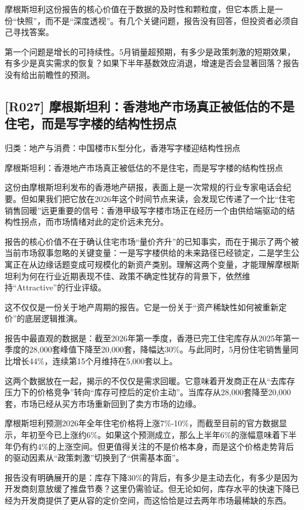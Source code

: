 \documentclass[11pt]{ctexart}
\begin{document}
摩根斯坦利这份报告的核心价值在于数据的及时性和颗粒度，但它本质上是一份“快照”，而不是“深度透视”。有几个关键问题，报告没有回答，但投资者必须自己寻找答案。

第一个问题是增长的可持续性。5月销量超预期，有多少是政策刺激的短期效果，有多少是真实需求的恢复？如果下半年基数效应消退，增速是否会显著回落？报告没有给出前瞻性的预测。

\subsection{[R027] 摩根斯坦利：香港地产市场真正被低估的不是住宅，而是写字楼的结构性拐点}
{\small\color{refgray}归类：地产与消费：中国楼市K型分化，香港写字楼迎结构性拐点}

摩根斯坦利：香港地产市场真正被低估的不是住宅，而是写字楼的结构性拐点

这份由摩根斯坦利发布的香港地产研报，表面上是一次常规的行业专家电话会纪要。但如果我们把它放在2026年这个时间节点来读，会发现它传递了一个比“住宅销售回暖”远更重要的信号：香港甲级写字楼市场正在经历一个由供给端驱动的结构性拐点，而市场情绪对此的定价远未充分。

报告的核心价值不在于确认住宅市场“量价齐升”的已知事实，而在于揭示了两个被当前市场叙事忽略的关键变量：一是写字楼供给的未来路径已经锁定，二是学生公寓正在从边缘话题变成可规模化的新资产类别。理解这两个变量，才能理解摩根斯坦利为何在行业近期表现不佳、政策不确定性犹存的背景下，依然维持“Attractive”的行业评级。

这不仅仅是一份关于地产周期的报告。它是一份关于“资产稀缺性如何被重新定价”的底层逻辑推演。

报告中最直观的数据是：截至2026年第一季度，香港已完工住宅库存从2025年第一季度的28,000套峰值下降至20,000套，降幅达30\%。与此同时，5月份住宅销售量同比增长44\%，连续第15个月维持在5,000套以上。

这两个数据放在一起，揭示的不仅仅是需求回暖。它意味着开发商正在从“去库存压力下的价格竞争”转向“库存可控后的定价主动”。当库存从28,000套降至20,000套，市场已经从买方市场重新回到了卖方市场的边缘。

摩根斯坦利预测2026年全年住宅价格将上涨7\%-10\%，而截至目前的官方数据显示，年初至今已上涨约6\%。如果这个预测成立，那么上半年6\%的涨幅意味着下半年仍有约4\%的上涨空间。但更值得关注的不是价格本身，而是这个价格走势背后的驱动因素从“政策刺激”切换到了“供需基本面”。

报告没有明确展开的是：库存下降30\%的背后，有多少是主动去化，有多少是因为开发商刻意放缓了推盘节奏？这里仍需验证。但无论如何，库存水平的快速下降已经为开发商提供了更从容的定价空间，而这恰恰是过去两年市场最稀缺的东西。
\end{document}

